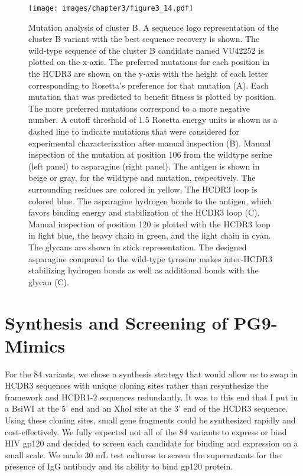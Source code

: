 \begin{figure}
   \centering
   \texttt{[image: images/chapter3/figure3\_14.pdf]} %
   \caption[Mutation Analysis of Cluster B]{Mutation analysis of cluster B. A sequence logo representation of the cluster B variant with the best sequence recovery is shown. The wild-type sequence of the cluster B candidate named VU42252 is plotted on the x-axis. The preferred mutations for each position in the HCDR3 are shown on the y-axis with the height of each letter corresponding to Rosetta’s preference for that mutation (A). Each mutation that was predicted to benefit fitness is plotted by position. The more preferred mutations correspond to a more negative number. A cutoff threshold of 1.5 Rosetta energy units is shown as a dashed line to indicate mutations that were considered for experimental characterization after manual inspection (B). Manual inspection of the mutation at position 106 from the wildtype serine (left panel) to asparagine (right panel). The antigen is shown in beige or gray, for the wildtype and mutation, respectively. The surrounding residues are colored in yellow. The HCDR3 loop is colored blue. The asparagine hydrogen bonds to the antigen, which favors binding energy and stabilization of the HCDR3 loop (C). Manual inspection of position 120 is plotted with the HCDR3 loop in light blue, the heavy chain in green, and the light chain in cyan. The glycans are shown in stick representation. The designed asparagine compared to the wild-type tyrosine makes inter-HCDR3 stabilizing hydrogen bonds as well as additional bonds with the glycan (C).}
   \label{fig:figure3_14}
\end{figure}

\section{Synthesis and Screening of PG9-Mimics}
For the 84 variants, we chose a synthesis strategy that would allow us to swap in HCDR3 sequences with unique cloning sites rather than resynthesize the framework and HCDR1-2 sequences redundantly. It was to this end that I put in a BsiWI at the 5’ end and an XhoI site at the 3’ end of the HCDR3 sequence. Using these cloning sites, small gene fragments could be synthesized rapidly and cost-effectively.
We fully expected not all of the 84 variants to express or bind HIV gp120 and decided to screen each candidate for binding and expression on a small scale.  We made 30 mL test cultures to screen the supernatants for the presence of IgG antibody and its ability to bind gp120 protein.

